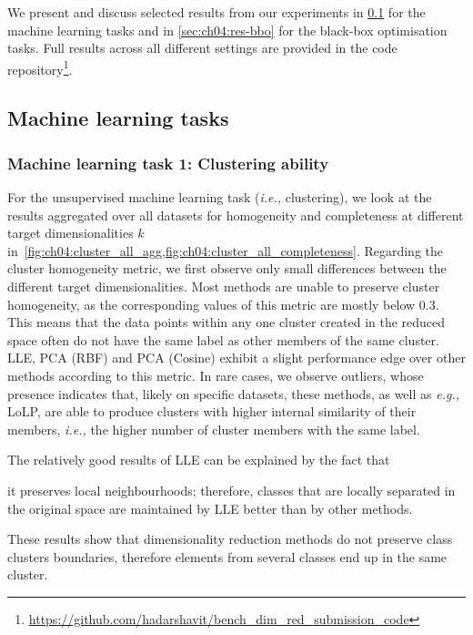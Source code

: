 We present and discuss selected results from our experiments in \cref{sec:ch04:res-ml} for the machine learning tasks and in \cref{sec:ch04:res-bbo} for the black-box optimisation tasks.
Full results across all different settings are provided in the code repository\footnote{\url{https://github.com/hadarshavit/bench_dim_red_submission_code}}.



\subsection{Machine learning tasks}
\label{sec:ch04:res-ml}



\subsubsection*{Machine learning task 1: Clustering ability}


For the unsupervised machine learning task (\emph{i.e.,} clustering), we look at the results aggregated over all datasets for homogeneity and completeness at different target dimensionalities $k$ in~\cref{fig:ch04:cluster_all_agg,fig:ch04:cluster_all_completeness}.
Regarding the cluster homogeneity metric, we first observe only small differences between the different target dimensionalities.
Most methods are unable to preserve cluster homogeneity, as the corresponding values of this metric are mostly below $0.3$.
This means that the data points within any one cluster created in the reduced space often do not have the same label as other members of the same cluster.
LLE, PCA (RBF) and PCA (Cosine) exhibit a slight performance edge over other methods according to this metric.
In rare cases, we observe outliers, whose presence indicates that, likely on specific datasets, these methods, as well as \emph{e.g.,} LoLP, are able to produce clusters with higher internal similarity of their members, \emph{i.e.,} the higher number of cluster members with the same label.

The relatively good results of LLE can be explained by the fact that


it preserves local neighbourhoods; therefore, classes that are locally separated in the original space are maintained by LLE better than by other methods.

These results show that dimensionality reduction methods do not preserve class clusters boundaries, therefore elements from several classes end up in the same cluster.


